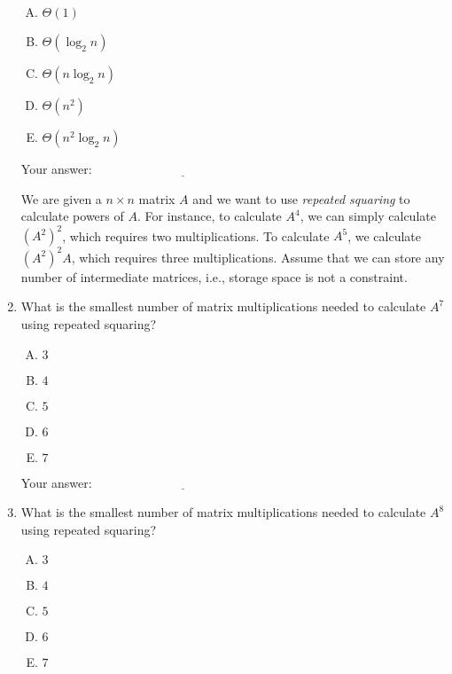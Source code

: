 \documentclass[10pt]{amsart}
\begin{document}
\begin{enumerate}
  \begin{enumerate}[(A)]
  \item $\Theta(1)$
  \item $\Theta(\log_2 n)$
  \item $\Theta(n \log_2 n)$
  \item $\Theta(n^2)$
  \item $\Theta(n^2 \log_2 n)$
  \end{enumerate}

  \vspace{0.1in}
  Your answer: $\underline{\qquad\qquad\qquad\qquad\qquad\qquad\qquad}$
  \vspace{0.1in}
  
  We are given a $n \times n$ matrix $A$ and we want to use {\em
    repeated squaring} to calculate powers of $A$. For instance, to
  calculate $A^4$, we can simply calculate $(A^2)^2$, which requires
  two multiplications. To calculate $A^5$, we calculate $(A^2)^2A$,
  which requires three multiplications. Assume that we can store any
  number of intermediate matrices, i.e., storage space is not a
  constraint.

\item What is the smallest number of matrix multiplications needed to
  calculate $A^7$ using repeated squaring?

  \begin{enumerate}[(A)]
  \item $3$
  \item $4$
  \item $5$
  \item $6$
  \item $7$
  \end{enumerate}

  \vspace{0.1in}
  Your answer: $\underline{\qquad\qquad\qquad\qquad\qquad\qquad\qquad}$
  \vspace{0.1in}

\item What is the smallest number of matrix multiplications needed to
  calculate $A^8$ using repeated squaring?

  \begin{enumerate}[(A)]
  \item $3$
  \item $4$
  \item $5$
  \item $6$
  \item $7$
  \end{enumerate}


\end{enumerate}
\end{document}
